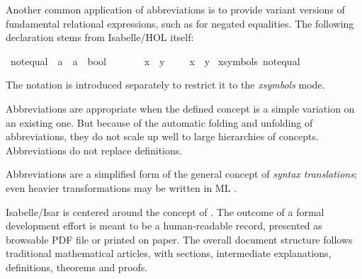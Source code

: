 \begin{isabellebody}
\begin{isamarkuptext}
Another common application of abbreviations is to
provide variant versions of fundamental relational expressions, such
as \isa{{\isasymnoteq}} for negated equalities.  The following declaration
stems from Isabelle/HOL itself:%
\end{isamarkuptext}%
\isamarkuptrue%
\isamarkupfalse%
\ not{\isacharunderscore}equal\ {\isacharcolon}{\isacharcolon}\ {\isachardoublequoteopen}{\isacharprime}a\ {\isasymRightarrow}\ {\isacharprime}a\ {\isasymRightarrow}\ bool{\isachardoublequoteclose}\ \ \ \ {\isacharparenleft}\ {\isachardoublequoteopen}{\isachartilde}{\isacharequal}{\isasymignore}{\isachardoublequoteclose}\ {}{}{\isacharparenright}\isanewline
{}\ {\isachardoublequoteopen}x\ {\isachartilde}{\isacharequal}{\isasymignore}\ y\ \ {\isasymequiv}\ \ {\isasymnot}\ {\isacharparenleft}x\ {\isacharequal}\ y{\isacharparenright}{\isachardoublequoteclose}\isanewline
\isanewline
{}\isamarkupfalse%
\ {\isacharparenleft}xsymbols{\isacharparenright}\ not{\isacharunderscore}equal\ {\isacharparenleft}\ {\isachardoublequoteopen}{\isasymnoteq}{\isasymignore}{\isachardoublequoteclose}\ {}{}{\isacharparenright}%
\begin{isamarkuptext}%
\noindent The notation \isa{{\isasymnoteq}} is introduced separately to restrict it
to the \emph{xsymbols} mode.

Abbreviations are appropriate when the defined concept is a
simple variation on an existing one.  But because of the automatic
folding and unfolding of abbreviations, they do not scale up well to
large hierarchies of concepts. Abbreviations do not replace
definitions.

Abbreviations are a simplified form of the general concept of
\emph{syntax translations}; even heavier transformations may be
written in ML \cite{isabelle-ref}.%
\end{isamarkuptext}%
\isamarkuptrue%
%
\isamarkuptrue%
%
\begin{isamarkuptext}%
Isabelle/Isar is centered around the concept of .  The outcome of a formal
  development effort is meant to be a human-readable record, presented
  as browsable PDF file or printed on paper.  The overall document
  structure follows traditional mathematical articles, with sections,
  intermediate explanations, definitions, theorems and proofs.


\end{isamarkuptext}
\end{isabellebody}
